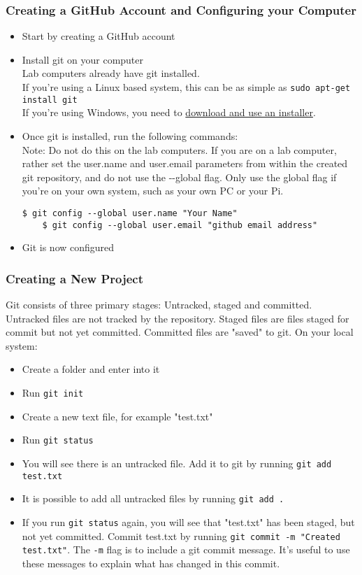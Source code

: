 \subsubsection{Creating a GitHub Account and Configuring your Computer}
\begin{itemize}
    \item Start by creating a GitHub account
    \item Install git on your computer\\
    Lab computers already have git installed.\\
    If you're using a Linux based system, this can be as simple as \verb|sudo apt-get install git|\\
    If you're using Windows, you need to \href{https://git-scm.com/download/win}{download and use an installer}.
    \item Once git is installed, run the following commands:\\
    Note: Do not do this on the lab computers. If you are on a lab computer, rather set the user.name and user.email parameters from within the created git repository, and do not use the \--\--global flag. Only use the global flag if you're on your own system, such as your own PC or your Pi.\\
    \begin{lstlisting}[gobble=4]
    $ git config --global user.name "Your Name"
    $ git config --global user.email "github email address"
    \end{lstlisting}
    \item Git is now configured
\end{itemize}

\subsubsection{Creating a New Project}
Git consists of three primary stages: Untracked, staged and committed. Untracked files are not tracked by the repository. Staged files are files staged for commit but not yet committed. Committed files are "saved" to git.
On your local system:
\begin{itemize}
    \item Create a folder and enter into it
    \item Run \verb|git init|
    \item Create a new text file, for example "test.txt"
    \item Run \verb|git status|
    \item You will see there is an untracked file. Add it to git by running \verb|git add test.txt|
    \item It is possible to add all untracked files by running \verb|git add .|
    \item If you run \verb|git status| again, you will see that "test.txt" has been staged, but not yet committed. Commit test.txt by running \verb|git commit -m "Created test.txt"|. The \verb|-m| flag is to include a git commit message. It's useful to use these messages to explain what has changed in this commit.
\end{itemize}

